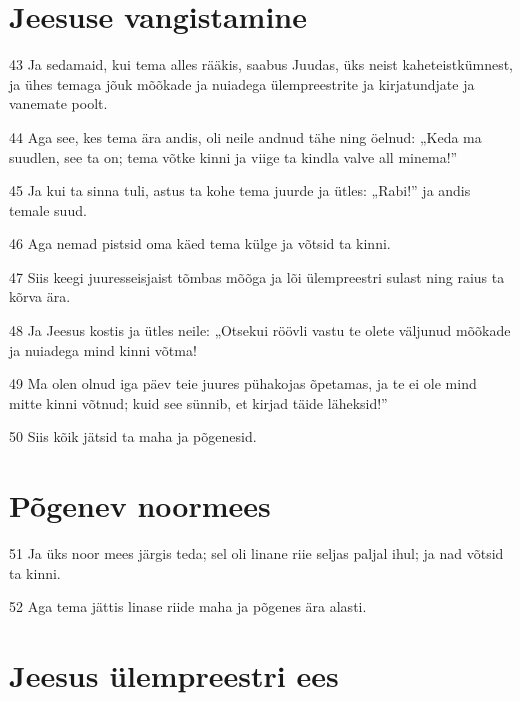 \section*{Jeesuse vangistamine}

\par 43 Ja sedamaid, kui tema alles rääkis, saabus Juudas, üks neist kaheteistkümnest, ja ühes temaga jõuk mõõkade ja nuiadega ülempreestrite ja kirjatundjate ja vanemate poolt.
\par 44 Aga see, kes tema ära andis, oli neile andnud tähe ning öelnud: „Keda ma suudlen, see ta on; tema võtke kinni ja viige ta kindla valve all minema!”
\par 45 Ja kui ta sinna tuli, astus ta kohe tema juurde ja ütles: „Rabi!” ja andis temale suud.
\par 46 Aga nemad pistsid oma käed tema külge ja võtsid ta kinni.
\par 47 Siis keegi juuresseisjaist tõmbas mõõga ja lõi ülempreestri sulast ning raius ta kõrva ära.
\par 48 Ja Jeesus kostis ja ütles neile: „Otsekui röövli vastu te olete väljunud mõõkade ja nuiadega mind kinni võtma!
\par 49 Ma olen olnud iga päev teie juures pühakojas õpetamas, ja te ei ole mind mitte kinni võtnud; kuid see sünnib, et kirjad täide läheksid!”
\par 50 Siis kõik jätsid ta maha ja põgenesid.

\section*{Põgenev noormees}

\par 51 Ja üks noor mees järgis teda; sel oli linane riie seljas paljal ihul; ja nad võtsid ta kinni.
\par 52 Aga tema jättis linase riide maha ja põgenes ära alasti.

\section*{Jeesus ülempreestri ees}

